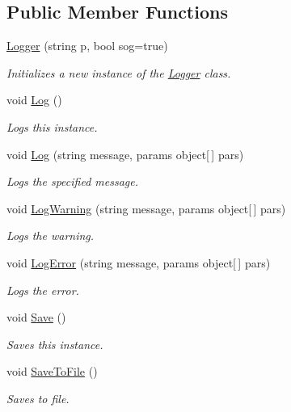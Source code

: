 \subsection*{Public Member Functions}
\begin{DoxyCompactItemize}
\item 
\hyperlink{class_lerp2_a_p_i_1_1_safe_e_calls_1_1_logger_a98d4fb2ea03458b4a82ace76504e721f}{Logger} (string p, bool sog=true)
\begin{DoxyCompactList}\small\item\em Initializes a new instance of the \hyperlink{class_lerp2_a_p_i_1_1_safe_e_calls_1_1_logger}{Logger} class. \end{DoxyCompactList}\item 
void \hyperlink{class_lerp2_a_p_i_1_1_safe_e_calls_1_1_logger_afc13847cd5053a6e6aa0d5c8f41ce9cc}{Log} ()
\begin{DoxyCompactList}\small\item\em Logs this instance. \end{DoxyCompactList}\item 
void \hyperlink{class_lerp2_a_p_i_1_1_safe_e_calls_1_1_logger_a67a56223a076c17cdc2f54160b4fd1b8}{Log} (string message, params object\mbox{[}$\,$\mbox{]} pars)
\begin{DoxyCompactList}\small\item\em Logs the specified message. \end{DoxyCompactList}\item 
void \hyperlink{class_lerp2_a_p_i_1_1_safe_e_calls_1_1_logger_a2890fe877c2b2d9225d6f3dee0998ce6}{Log\+Warning} (string message, params object\mbox{[}$\,$\mbox{]} pars)
\begin{DoxyCompactList}\small\item\em Logs the warning. \end{DoxyCompactList}\item 
void \hyperlink{class_lerp2_a_p_i_1_1_safe_e_calls_1_1_logger_a58926654a815d526808a9c204de3c1b0}{Log\+Error} (string message, params object\mbox{[}$\,$\mbox{]} pars)
\begin{DoxyCompactList}\small\item\em Logs the error. \end{DoxyCompactList}\item 
void \hyperlink{class_lerp2_a_p_i_1_1_safe_e_calls_1_1_logger_a12892563e5b82f18ba845b1140b19feb}{Save} ()
\begin{DoxyCompactList}\small\item\em Saves this instance. \end{DoxyCompactList}\item 
void \hyperlink{class_lerp2_a_p_i_1_1_safe_e_calls_1_1_logger_a5bd6c557cfff65281e5e92ec62ef8516}{Save\+To\+File} ()
\begin{DoxyCompactList}\small\item\em Saves to file. \end{DoxyCompactList}\end{DoxyCompactItemize}
